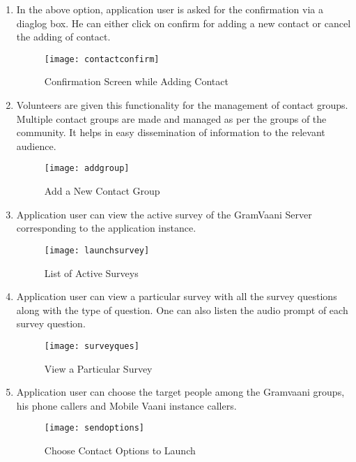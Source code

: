 \begin {enumerate}
\item In the above option, application user is asked for the confirmation via a diaglog box. He can either click on confirm for adding a new contact or cancel the adding of contact.
\begin{figure}[H]
\begin{center}   
\texttt{[image: contactconfirm]}
\caption{Confirmation Screen while Adding Contact}
\label{fig:contact2}
\end{center}
\end{figure}
 
\item  Volunteers are given this functionality for the management of contact groups. Multiple contact groups are made and managed as per the groups of the community. It helps in easy dissemination of information to the relevant audience.
\begin{figure}[H]
\begin{center}   
\texttt{[image: addgroup]}
\caption{Add a New Contact Group}
\label{fig:group1}
\end{center}
\end{figure}

\item Application user can view the active survey of the GramVaani Server corresponding to the application instance.
\begin{figure}[H]
\begin{center}   
\texttt{[image: launchsurvey]}
\caption{List of Active Surveys}
\label{fig:viewlaunchsurvey}
\end{center}
\end{figure}

\item Application user can view a particular survey with all the survey questions along with the type of question. One can also listen the audio prompt of each survey question.
\begin{figure}[H]
\begin{center}   
\texttt{[image: surveyques]}
\caption{View a Particular Survey}
\label{fig:viewsurvey}
\end{center}
\end{figure}

\item  Application user can choose the target people among the Gramvaani groups, his phone callers and  Mobile Vaani instance callers.
\begin{figure}[H]
\begin{center}   
\texttt{[image: sendoptions]}
\caption{Choose Contact Options to Launch}
\label{fig:contactoptions}
\end{center}
\end{figure}


\end{enumerate}
